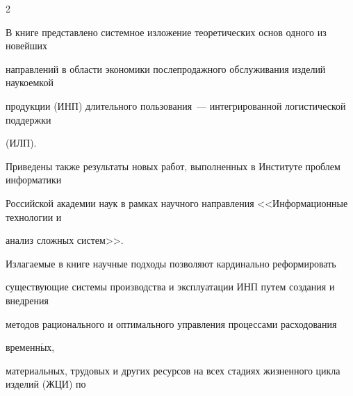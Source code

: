 \titele{\tit}{\aut}{\auf}{\leftkol}{\rightkol}


\vspace*{-18pt}








     \label{st\stat}





     \begin{multicols}{2}


     {\small


     {\baselineskip=10.1pt


     





      В книге представлено системное изложение теоретических основ одного из новейших 


направлений в \mbox{об\-ласти} экономики послепродажного обслуживания изделий наукоемкой 


продукции (ИНП) длительного пользования~--- интегрированной логистической поддержки


(ИЛП). 


{





}





Приведены также результаты новых работ, выполненных в Институте проблем информатики 


Российской академии наук в рамках научного направления <<Информационные технологии и 


анализ сложных сис\-тем>>.


 {%





}


     


      Излагаемые в книге научные подходы позво\-ляют карди\-наль\-но реформировать 


существующие системы производства и эксплуатации ИНП путем создания и внед\-ре\-ния 


методов рационального и оптимального управ\-ле\-ния процессами расходования 


вре\-мен\-н$\acute{\mbox{ы}}$х, 


мате\-ри\-аль\-ных, трудовых и других ресурсов на всех стадиях жизненного цикла изделий (ЖЦИ) по 


}}
\end{multicols}
